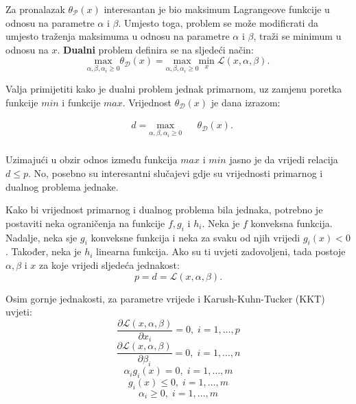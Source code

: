 \documentclass[times, utf8, zavrsni, numeric]{fer}
\begin{document}
\par Za pronalazak $\theta_\mathcal{P}(x)$ interesantan je bio maksimum Lagrangeove funkcije u odnosu na 
parametre $\alpha$ i $\beta$.
Umjesto toga, problem se može modificrati da umjesto traženja maksimuma u odnosu na parametre $\alpha$ i $\beta$,
traži se minimum u odnosu na $x$. 
\textbf{Dualni} problem definira se na sljedeći način:
\begin{equation}
\underset{\alpha, \beta, \alpha_i \geq 0}{\text{max}} \theta_\mathcal{D}(x) = 
\underset{\alpha, \beta, \alpha_i \geq 0}{\text{max}} \underset{x}{\text{min}} \; \mathcal{L}(x, \alpha, \beta).
\end{equation}

\par Valja primijetiti kako je dualni problem jednak primarnom, uz zamjenu poretka funkcije $min$ i funkcije $max$.
Vrijednost $\theta_\mathcal{D}(x)$ je dana izrazom:

\begin{equation}
\begin{aligned}
& d = \underset{\alpha, \beta, \alpha_i \geq 0}{\text{max}}
& & \theta_\mathcal{D}(x).\\
\end{aligned}
\end{equation}

Uzimajući u obzir odnos između funkcija $max$ i $min$ jasno je da vrijedi relacija $d \leq p$.
No, posebno su interesantni slučajevi gdje su vrijednosti primarnog i dualnog problema jednake.

\par Kako bi vrijednost primarnog i dualnog problema bila jednaka, potrebno je postaviti neka ograničenja
na funkcije $f, g_i$ i $h_i$. Neka je $f$ konveksna funkcija. Nadalje, neka sje $g_i$ konveksne funkcija 
i neka za svaku od njih vrijedi $g_i(x) < 0$. 
Također, neka je $h_i$ linearna funkcija. 
Ako su ti uvjeti zadovoljeni, tada postoje $\alpha, \beta$ i $x$ za koje vrijedi sljedeća jednakost: 
\begin{equation}
  p = d = \mathcal{L}(x, \alpha, \beta).
\end{equation}

Osim gornje jednakosti, za parametre vrijede i Karush-Kuhn-Tucker (KKT) uvjeti:
\begin{equation}
  \frac{\partial \mathcal{L}(x, \alpha, \beta)}{\partial x_i} = 0, \; i = 1, \ldots, p
\end{equation}
\begin{equation}
  \frac{\partial \mathcal{L}(x, \alpha, \beta)}{\partial \beta_i} = 0, \; i = 1, \ldots, n
\end{equation}
\begin{equation}
  \alpha_ig_i(x) = 0, \; i = 1, \ldots, m
  \label{eq:inter}
\end{equation}
\begin{equation}
  g_i(x) \leq 0, \; i = 1, \ldots, m
\end{equation}
\begin{equation}
  \alpha_i \geq 0, \; i = 1, \ldots, m
\end{equation}
\end{document}
